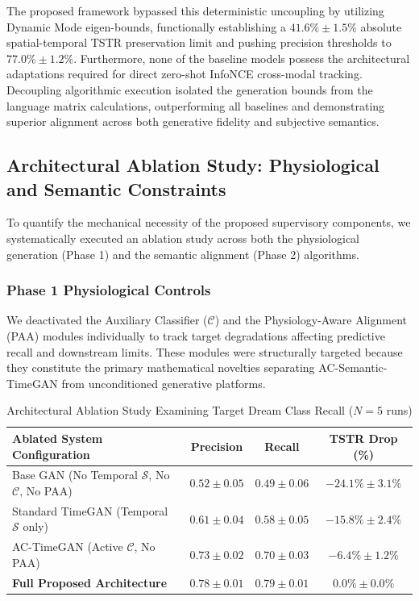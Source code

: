 \documentclass[journal]{IEEEtran}
\begin{document}
The proposed framework bypassed this deterministic uncoupling by utilizing Dynamic Mode eigen-bounds, functionally establishing a $41.6\% \pm 1.5\%$ absolute spatial-temporal TSTR preservation limit and pushing precision thresholds to $77.0\% \pm 1.2\%$. Furthermore, none of the baseline models possess the architectural adaptations required for direct zero-shot InfoNCE cross-modal tracking. Decoupling algorithmic execution isolated the generation bounds from the language matrix calculations, outperforming all baselines and demonstrating superior alignment across both generative fidelity and subjective semantics. 

\subsection{Architectural Ablation Study: Physiological and Semantic Constraints}

To quantify the mechanical necessity of the proposed supervisory components, we systematically executed an ablation study across both the physiological generation (Phase 1) and the semantic alignment (Phase 2) algorithms. 

\subsubsection{Phase 1 Physiological Controls}
We deactivated the Auxiliary Classifier ($\mathcal{C}$) and the Physiology-Aware Alignment (PAA) modules individually to track target degradations affecting predictive recall and downstream limits. These modules were structurally targeted because they constitute the primary mathematical novelties separating AC-Semantic-TimeGAN from unconditioned generative platforms.

\begin{table}[t]
\centering
\caption{Architectural Ablation Study Examining Target Dream Class Recall ($N=5$ runs)}
\label{tab:ablation}
\begin{tabular}{lccc}
\toprule
\textbf{Ablated System Configuration} & \textbf{Precision} & \textbf{Recall} & \textbf{TSTR Drop (\%)} \\
\midrule
Base GAN (No Temporal $\mathcal{S}$, No $\mathcal{C}$, No PAA) & $0.52 \pm 0.05$ & $0.49 \pm 0.06$ & $-24.1\% \pm 3.1\%$ \\
Standard TimeGAN (Temporal $\mathcal{S}$ only) & $0.61 \pm 0.04$ & $0.58 \pm 0.05$ & $-15.8\% \pm 2.4\%$ \\
AC-TimeGAN (Active $\mathcal{C}$, No PAA) & $0.73 \pm 0.02$ & $0.70 \pm 0.03$ & $-6.4\% \pm 1.2\%$ \\
\textbf{Full Proposed Architecture} & \textbf{$0.78 \pm 0.01$} & \textbf{$0.79 \pm 0.01$} & \textbf{$0.0\% \pm 0.0\%$} \\
\bottomrule
\end{tabular}
\end{table}
\end{document}
